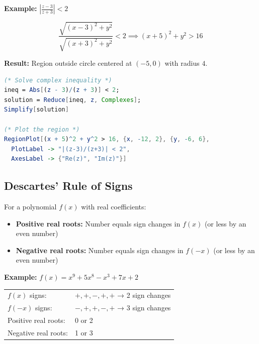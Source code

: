 \documentclass[12pt,a4paper]{article}
\begin{document}
\begin{formulabox}
    \textbf{Example:} \( \left| \frac{z-3}{z+3} \right| < 2 \)
    
    \[
    \frac{\sqrt{(x-3)^2 + y^2}}{\sqrt{(x+3)^2 + y^2}} < 2
    \implies (x+5)^2 + y^2 > 16
    \]
    
    \textbf{Result:} Region outside circle centered at \((-5,0)\) with radius \(4\).
\end{formulabox}

\begin{mathematicabox}
    \begin{lstlisting}[language=Mathematica, basicstyle=\ttfamily\small]
(* Solve complex inequality *)
ineq = Abs[(z - 3)/(z + 3)] < 2;
solution = Reduce[ineq, z, Complexes];
Simplify[solution]

(* Plot the region *)
RegionPlot[(x + 5)^2 + y^2 > 16, {x, -12, 2}, {y, -6, 6},
  PlotLabel -> "|(z-3)/(z+3)| < 2",
  AxesLabel -> {"Re(z)", "Im(z)"}]
    \end{lstlisting}
\end{mathematicabox}

\subsection{Descartes' Rule of Signs}

\begin{definitionbox}
    For a polynomial \(f(x)\) with real coefficients:
    \begin{itemize}
        \item \textbf{Positive real roots:} Number equals sign changes in \(f(x)\) (or less by an even number)
        \item \textbf{Negative real roots:} Number equals sign changes in \(f(-x)\) (or less by an even number)
    \end{itemize}
\end{definitionbox}

\begin{formulabox}
    \textbf{Example:} \(f(x) = x^9 + 5x^8 - x^3 + 7x + 2\)
    
    \begin{tabular}{ll}
    \(f(x)\) signs: & \(+, +, -, +, +\) → 2 sign changes \\
    \(f(-x)\) signs: & \(-, +, +, -, +\) → 3 sign changes \\
    \hline
    Positive real roots: & 0 or 2 \\
    Negative real roots: & 1 or 3 \\
    \end{tabular}
\end{formulabox}
\end{document}
